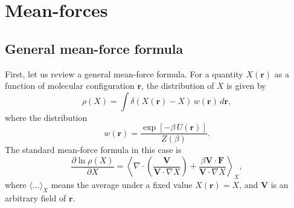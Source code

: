 \documentclass{article}
\begin{document}
\newcommand{\vct}[1]{\mathbf{#1}}
\newcommand{\vx}{\vct{x}}
\newcommand{\vy}{\vct{y}}
\newcommand{\Z}{\mathcal{Z}}
\newcommand{\E}{\mathcal{E}}
\newcommand{\Ham}{\mathcal{H}}
\newcommand{\W}{\mathcal{W}}
\newcommand{\A}{\mathcal{A}}
\newcommand{\LL}{\mathcal{L}}
\newcommand{\var}{\mathrm{var}}
\newcommand{\com}{\mathrm{com}}

\newcommand{\llbra}{[\![}
\newcommand{\llket}{]\!]}

\newcommand{\repl}[2]{{\color{gray} [#1] }{\color{blue} #2}}
\newcommand{\add}[1]{{\color{blue} #1}}
\newcommand{\del}[1]{{\color{gray} [#1]}}
\newcommand{\note}[1]{{\color{OliveGreen}\small [\textbf{Comment.} #1]}}





\author{ \vspace{-10ex} }
\date{ \vspace{-10ex} }







\section{Mean-forces}


\subsection{General mean-force formula}


First, let us review a general mean-force formula.
%
For a quantity $X(\mathbf r)$
as a function of molecular configuration $\mathbf r$,
the distribution of $X$ is given by
$$
\rho(X)
=
\int \delta(X(\mathbf r) - X) \, w(\mathbf r) \, d\mathbf r,
$$
where the distribution
$$
w(\mathbf r)
=
\frac{ \exp[ - \beta \, U(\mathbf r) ] }
     { Z(\beta) }
.
$$
The standard mean-force formula in this case is
$$
\frac{ \partial \ln \rho(X) }
     { \partial X }
=
\left\langle
\nabla \cdot
  \left(
    \frac{ \mathbf V }
         { \mathbf V \cdot \nabla X }
  \right)
  +
  \frac{ \beta \mathbf V \cdot \mathbf F }
       { \mathbf V \cdot \nabla X }
\right\rangle_X
,
$$
where $\langle \dots \rangle_X$
means the average under a fixed value $X(\mathbf r) = X$,
and $\mathbf V$ is an arbitrary field of $\mathbf r$.
\end{document}
